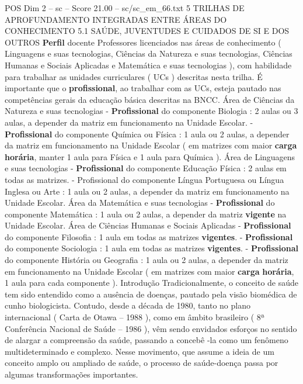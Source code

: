 \begin{textsample}{POS Dim 2 – sc – Score 21.00 – sc/sc\_em\_66.txt}  \label{ex:f2_pos_015}
5 TRILHAS DE APROFUNDAMENTO INTEGRADAS ENTRE ÁREAS DO CONHECIMENTO 5.1 SAÚDE, JUVENTUDES E CUIDADOS DE SI E DOS OUTROS \textbf{Perfil} docente Professores licenciados nas áreas de conhecimento ( Linguagens e suas tecnologias, Ciências da Natureza e suas tecnologias, Ciências Humanas e Sociais Aplicadas e Matemática e suas tecnologias ), com habilidade para trabalhar as unidades curriculares ( UCs ) descritas nesta trilha.
É importante que o \textbf{profissional}, ao trabalhar com as UCs, esteja pautado nas competências gerais da educação básica descritas na BNCC.
Área de Ciências da Natureza e suas tecnologias - \textbf{Profissional} do componente Biologia : 2 aulas ou 3 aulas, a depender da matriz em funcionamento na Unidade Escolar. - \textbf{Profissional} do componente Química ou Física : 1 aula ou 2 aulas, a depender da matriz em funcionamento na Unidade Escolar ( em matrizes com maior \textbf{carga} \textbf{horária}, manter 1 aula para Física e 1 aula para Química ).
Área de Linguagens e suas tecnologias - \textbf{Profissional} do componente Educação Física : 2 aulas em todas as matrizes. - Profissional do componente Língua Portuguesa ou Língua Inglesa ou Arte : 1 aula ou 2 aulas, a depender da matriz em funcionamento na Unidade Escolar.
Área da Matemática e suas tecnologias - \textbf{Profissional} do componente Matemática : 1 aula ou 2 aulas, a depender da matriz \textbf{vigente} na Unidade Escolar.
Área de Ciências Humanas e Sociais Aplicadas - \textbf{Profissional} do componente Filosofia : 1 aula em todas as matrizes \textbf{vigentes}. - \textbf{Profissional} do componente Sociologia : 1 aula em todas as matrizes \textbf{vigentes}. - \textbf{Profissional} do componente História ou Geografia : 1 aula ou 2 aulas, a depender da matriz em funcionamento na Unidade Escolar ( em matrizes com maior \textbf{carga} \textbf{horária}, 1 aula para cada componente ).
Introdução Tradicionalmente, o conceito de saúde tem sido entendido como a ausência de doenças, pautado pela visão biomédica de cunho biologicista.
Contudo, desde a década de 1980, tanto no plano internacional ( Carta de Otawa – 1988 ), como em âmbito brasileiro ( 8ª Conferência Nacional de Saúde – 1986 ), vêm sendo envidados esforços no sentido de alargar a compreensão da saúde, passando a concebê -la como um fenômeno multideterminado e complexo.
Nesse movimento, que assume a ideia de um conceito amplo ou ampliado de saúde, o processo de saúde-doença passa por algumas transformações importantes.

\end{textsample}
